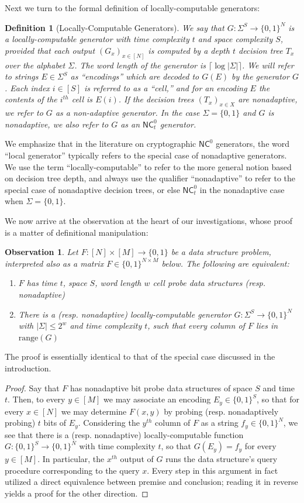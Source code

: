 \documentclass[11pt]{article}
\newtheorem{definition}{Definition}
\newtheorem{observation}{Observation}
\newcommand{\B}{\{0,1\}}
\newcommand{\rng}{\mathrm{range}}
\newcommand{\N}{[N]}
\begin{document}
Next we turn to the formal definition of locally-computable generators:
\begin{definition}[Locally-Computable Generators]
We say that $G: \Sigma^S \to \B^N$ is a locally-computable generator with time complexity $t$ and space complexity $S$, provided that each output $(G_x)_{x \in [N]}$ is computed by a depth $t$ decision tree $T_x$ over the alphabet $\Sigma$. The word length of the generator is $\lceil \log |\Sigma|\rceil $. We will refer to strings $E \in \Sigma^S$ as ``encodings'' which are decoded to $G(E)$ by the generator $G$. Each index $i \in [S]$ is referred to as a ``cell,'' and for an encoding $E$ the contents of the $i^{th}$ cell is $E(i)$. 
If the decision trees $(T_x)_{ x\in X}$ are nonadaptive, we refer to $G$ as a non-adaptive generator. In the case $\Sigma = \B$ and $G$ is nonadaptive, we also refer to $G$ as an $\mathsf{NC}^0_t$ generator.
\end{definition} 
We emphasize that in the literature on cryptographic $\mathsf{NC}^0$ generators, the word ``local generator'' typically refers to the special case of nonadaptive generators. We use the term ``locally-computable'' to refer to the more general notion based on decision tree depth, and always use the qualifier ``nonadaptive'' to refer to the special case of nonadaptive decision trees, or else $\mathsf{NC}^0_t$ in the nonadaptive case when $\Sigma = \B$.

We now arrive at the observation at the heart of our investigations, whose proof is a matter of definitional manipulation:
\begin{observation}\label{obs:main-correspondence}
Let $F: \N \times [M] \to \B$ be a data structure problem, interpreted also as a matrix $F \in \B^{N \times M}$ below. The following are equivalent:
\begin{enumerate}
    \item $F$ has time $t$, space $S$, word length $w$ cell probe data structures (resp. nonadaptive)
    \item There is a (resp. nonadaptive) locally-computable generator $G: \Sigma^S \to \B^N$ with $|\Sigma|\leq 2^w$ and time complexity $t$, such that every column of $F$ lies in $\rng(G)$
\end{enumerate}  
\end{observation}
The proof is essentially identical to that of the special case discussed in the introduction.
\begin{proof}
Say that $F$ has nonadaptive bit probe data structures of space $S$ and time $t$. Then, to every $y \in [M]$ we may associate an encoding $E_y \in \B^S$, so that for every $x \in [N]$ we may determine $F(x,y)$ by probing (resp. nonadaptively probing) $t$ bits of $E_y$. Considering the $y^{th}$ column of $F$ as a string $f_y\in \B^N$, we see that there is a (resp. nonadaptive) locally-computable function $G: \B^S \to \B^N$ with time complexity $t$, so that $G(E_y) = f_y$ for every $y\in [M]$. In particular, the $x^{th}$ output of $G$ runs the data structure's query procedure corresponding to the query $x$. Every step in this argument in fact utilized a direct equivalence between premise and conclusion; reading it in reverse yields a proof for the other direction.
\end{proof}
\end{document}
